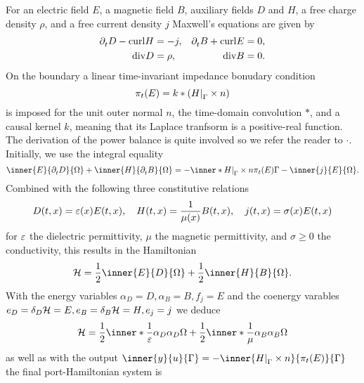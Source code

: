 \begin{example}\label{ex:maxwell}
    For an electric field $E$, a magnetic field $B$, auxiliary fields $D$ and $H$, a free charge density $\rho$, and a free current density $j$ Maxwell's equations are given by
    \begin{equation*}
        \begin{aligned}
            \pd[t]{} D - \curl{H} &= -j, &\pd[t]{} B + \curl{E} &= 0, \\
            \dvg{D} &= \rho, &\dvg{B} &= 0.
        \end{aligned}
    \end{equation*}
    On the boundary a linear time-invariant impedance bonudary condition
    \begin{equation*}
        \pi_t(E) = k * \left( \res{H}{\Gamma} \times n \right)
    \end{equation*}
    is imposed for the unit outer normal $n$, the time-domain convolution $*$, and a causal kernel $k$, meaning that its Laplace tranfsorm is a positive-real function.
    The derivation of the power balance is quite involved so we refer the reader to $\cdot$.
    Initially, we use the integral equality
    \begin{equation*}
        \inner{E}{\pd[t]{} D}{\Omega} + \inner{H}{\pd[t]{} B}{\Omega} = - \inner*{\res{H}{\Gamma} \times n}{\pi_t(E)}{\Gamma} - \inner{j}{E}{\Omega}.
    \end{equation*}
    Combined with the following three constitutive relations
    \begin{equation*}
        D(t, x) = \eps(x) E(t, x),\quad H(t, x) = \frac{1}{\mu(x)} B(t, x),\quad j(t, x) = \sigma(x) E(t, x)
    \end{equation*}
    for $\eps$ the dielectric permittivity, $\mu$ the magnetic permittivity, and $\sigma \geq 0$ the conductivity, this results in the Hamiltonian
    \begin{equation*}
        \mcl{H} = \frac{1}{2} \inner{E}{D}{\Omega} + \frac{1}{2} \inner{H}{B}{\Omega}.
    \end{equation*}
    With the energy variables $\alpha_D = D, \alpha_B = B, f_j = E$ and the coenergy varables $e_D = \delta_D \mcl{H} = E, e_B = \delta_B \mcl{H} = H, e_j = j$ we deduce
    \begin{equation*}
        \mcl{H} = \frac{1}{2} \inner*{\frac{1}{\eps} \alpha_D}{\alpha_D}{\Omega} + \frac{1}{2} \inner*{\frac{1}{\mu} \alpha_B}{\alpha_B}{\Omega}
    \end{equation*}
    as well as with the output $\inner{y}{u}{\Gamma} = - \inner{\res{H}{\Gamma} \times n}{\pi_t(E)}{\Gamma}$ the final port-Hamiltonian system is

\end{example}
